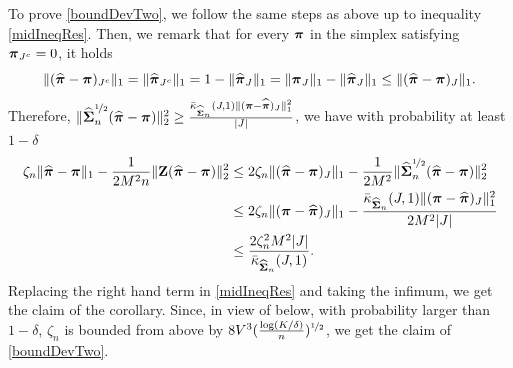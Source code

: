 To prove \eqref{boundDevTwo}, we follow the same steps as above up to inequality \eqref{midIneqRes}.
Then, we remark that for every $\boldsymbol \pi$ in the simplex satisfying $\boldsymbol \pi_{J^c}=0$, it holds
\begin{equation}\label{inqCone}
\|(\widehat{\boldsymbol \pi}-\boldsymbol \pi)_{J^c}\|_1= \|\widehat{\boldsymbol \pi}_{J^c}\|_1 = 1-\|\widehat{\boldsymbol \pi}_{J}\|_1 =
\|\boldsymbol \pi_{J}\|_1-\|\widehat{\boldsymbol \pi}_{J}\|_1\le \|(\widehat{\boldsymbol \pi}-\boldsymbol \pi)_{J}\|_1.
\end{equation}
Therefore, $\|\widehat{\boldsymbol\Sigma}_n^{\nicefrac12}(\widehat{\boldsymbol \pi}-\boldsymbol \pi)\|_2^2\ge \frac{\bar\kappa_{\widehat{\boldsymbol\Sigma}_n}(J,1)\| (\boldsymbol \pi-\widehat{\boldsymbol \pi})_J\|_1^2}{|J|}$, we have with probability at least $1-\delta$
\begin{align}
\zeta_n\| \widehat{\boldsymbol \pi} - \boldsymbol \pi\|_1 -\frac{1}{2M^2n}\|\mathbf Z(\widehat{\boldsymbol \pi}-\boldsymbol \pi)\|_2^2
&\leq 2\zeta_n\| (\widehat{\boldsymbol \pi}-\boldsymbol \pi)_J\|_1-\frac{1}{2M^2}\|\widehat{\boldsymbol\Sigma}_n^{\nicefrac12}(\widehat{\boldsymbol \pi}-\boldsymbol \pi)\|_2^2\nonumber\\
&\leq 2\zeta_n\| (\boldsymbol \pi-\widehat{\boldsymbol \pi})_J\|_1 - \frac{\bar\kappa_{\widehat{\boldsymbol\Sigma}_n}(J,1)\| (\boldsymbol \pi-\widehat{\boldsymbol \pi})_J\|_1^2}{2M^2|J|}\nonumber\\
&\leq \frac{2\zeta_n^2M^2|J|}{\bar\kappa_{\widehat{\boldsymbol\Sigma}_n}(J,1)}.\label{ineqa}
\end{align}
Replacing the right hand term in \eqref{midIneqRes} and taking the infimum, we get
the claim of the corollary. Since, in view of  below, with probability
larger than $1-\delta$, $\zeta_n$ is bounded from above by
$8V^3(\frac{\log(K/\delta)}{n})^{\nicefrac12}$, we get the claim of \eqref{boundDevTwo}.


